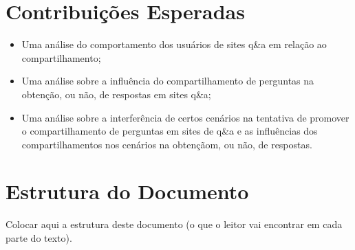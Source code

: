 \section{Contribuições Esperadas}
\begin{itemize}
\item Uma análise do comportamento dos usuários de sites q\&a em relação ao compartilhamento;
\item Uma análise sobre a influência do compartilhamento de perguntas na obtenção, ou não, de respostas em sites q\&a;
\item Uma análise sobre a interferência de certos cenários na tentativa de promover o compartilhamento de perguntas em sites de q\&a e as influências dos compartilhamentos nos cenários na obtençãom, ou não, de respostas.
\end{itemize}

\section{Estrutura do Documento}
Colocar aqui a estrutura deste documento (o que o leitor vai encontrar em cada parte do texto).